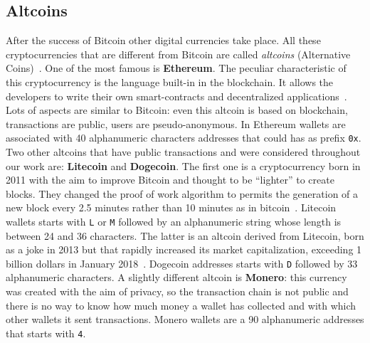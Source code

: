 \subsection{Altcoins}
After the success of Bitcoin other digital currencies take place. All these
cryptocurrencies that are different from Bitcoin are called \textit{altcoins}
(Alternative Coins)~\cite{bitcoinbeyond}. One of the most famous is 
\textbf{Ethereum}. The peculiar characteristic of this cryptocurrency is
the language built-in in the blockchain. It allows the developers to 
write their own smart-contracts and decentralized 
applications~\cite{bib:ethereum:whitepaper}.
Lots of aspects are similar to Bitcoin: even
this altcoin is based on blockchain, transactions are public, users are
pseudo-anonymous. In Ethereum wallets are associated with 40 alphanumeric
characters addresses that could has as prefix \texttt{0x}. 
Two other altcoins that have public transactions and were considered
throughout our work are: \textbf{Litecoin} and \textbf{Dogecoin}.
The first one is a cryptocurrency born in 2011 with the aim to improve 
Bitcoin and thought to be ``lighter'' to create blocks. 
They changed the proof of work algorithm to permits the
generation of a new block every 2.5 minutes rather than 10 minutes as in
bitcoin~\cite{bib:litecoin:wiki}. 
Litecoin wallets starts with \texttt{L} or \texttt{M} followed by an
alphanumeric string whose length is between 24 and 36 characters.
The latter is an altcoin derived from Litecoin, born as a joke in 2013 but
that rapidly increased its market capitalization, exceeding 1 billion dollars
in January 2018~\cite{}. Dogecoin addresses
starts with \texttt{D} followed by 33 alphanumeric characters.
A slightly different altcoin is \textbf{Monero}: this currency was created with
the aim of privacy, so the transaction chain is not public and there is no
way to know how much money a wallet has collected and with which other wallets
it sent transactions.
Monero wallets are a 90 alphanumeric addresses that starts with \texttt{4}.


